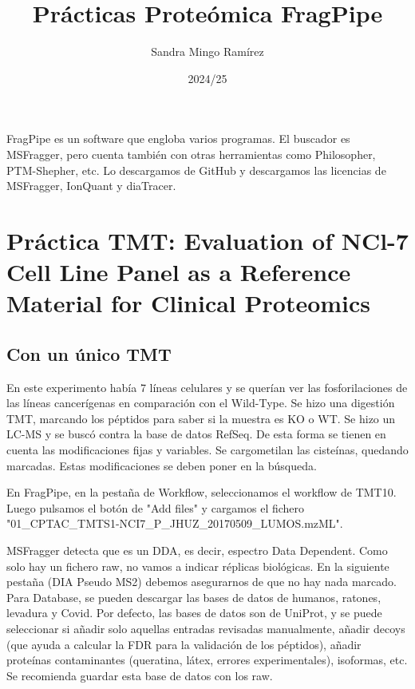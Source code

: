 \documentclass[nochap]{config/ejercicios}
\title{Prácticas Proteómica FragPipe}
\author{Sandra Mingo Ramírez}
\date{2024/25}
\begin{document}
\maketitle

\tableofcontents

\newpage

FragPipe es un software que engloba varios programas. El buscador es MSFragger, pero cuenta también con otras herramientas como Philosopher, PTM-Shepher, etc. Lo descargamos de GitHub y descargamos las licencias de MSFragger, IonQuant y diaTracer. 

\section{Práctica TMT: Evaluation of NCl-7 Cell Line Panel as a Reference Material for Clinical Proteomics}
\subsection{Con un único TMT}
En este experimento había 7 líneas celulares y se querían ver las fosforilaciones de las líneas cancerígenas en comparación con el Wild-Type. Se hizo una digestión TMT, marcando los péptidos para saber si la muestra es KO o WT. Se hizo un LC-MS y se buscó contra la base de datos RefSeq. De esta forma se tienen en cuenta las modificaciones fijas y variables. Se cargometilan las cisteínas, quedando marcadas. Estas modificaciones se deben poner en la búsqueda. 

En FragPipe, en la pestaña de Workflow, seleccionamos el workflow de TMT10. Luego pulsamos el botón de "Add files" y cargamos el fichero "01\_CPTAC\_TMTS1-NCI7\_P\_JHUZ\_20170509\_LUMOS.mzML". 

MSFragger detecta que es un DDA, es decir, espectro Data Dependent. Como solo hay un fichero raw, no vamos a indicar réplicas biológicas. En la siguiente pestaña (DIA Pseudo MS2) debemos asegurarnos de que no hay nada marcado. Para Database, se pueden descargar las bases de datos de humanos, ratones, levadura y Covid. Por defecto, las bases de datos son de UniProt, y se puede seleccionar si añadir solo aquellas entradas revisadas manualmente, añadir decoys (que ayuda a calcular la FDR para la validación de los péptidos), añadir proteínas contaminantes (queratina, látex, errores experimentales), isoformas, etc. Se recomienda guardar esta base de datos con los raw. 
\end{document}
